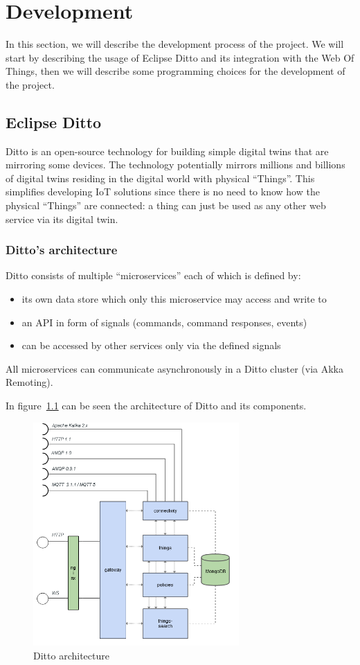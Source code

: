 \chapter{Development}
In this section, we will describe the development process of the project. We will start by describing the usage of Eclipse Ditto and its integration with the Web Of Things, then we will describe some programming choices for the development of the project.

\section{Eclipse Ditto}
Ditto is an open-source technology for building simple digital twins that are mirroring some devices.
The technology potentially mirrors millions and billions of digital twins residing in the digital world with physical ``Things''.
This simplifies developing IoT solutions since there is no need to know how the physical ``Things'' are connected:
a thing can just be used as any other web service via its digital twin.


\subsection{Ditto's architecture}
Ditto consists of multiple ``microservices'' each of which is defined by:
\begin{itemize}
	\item its own data store which only this microservice may access and write to
	\item an API in form of signals (commands, command responses, events)
	\item can be accessed by other services only via the defined signals
\end{itemize}
All microservices can communicate asynchronously in a Ditto cluster (via Akka Remoting).

In figure~\ref{fig:ditto-architecture} can be seen the architecture of Ditto and its components.

\begin{figure}[H]
	\centering
	\includegraphics[width=0.7\textwidth]{img/ditto-architecture.png}
	\caption{Ditto architecture}
	\label{fig:ditto-architecture}
\end{figure}


